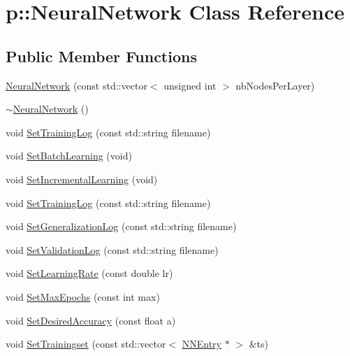 \hypertarget{classp_1_1NeuralNetwork}{\section{p\-:\-:\-Neural\-Network \-Class \-Reference}
\label{classp_1_1NeuralNetwork}
}
\subsection*{\-Public \-Member \-Functions}
\begin{DoxyCompactItemize}
\item 
\hyperlink{classp_1_1NeuralNetwork_a4ec206f877c28b8e71e2979e30329ebe}{\-Neural\-Network} (const std\-::vector$<$ unsigned int $>$ nb\-Nodes\-Per\-Layer)
\item 
\hyperlink{classp_1_1NeuralNetwork_ab0434af909567db330ee0cda44e99370}{$\sim$\-Neural\-Network} ()
\item 
void \hyperlink{classp_1_1NeuralNetwork_abdc9b3c37c6b241ec208e0e9612d321e}{\-Set\-Training\-Log} (const std\-::string filename)
\item 
void \hyperlink{classp_1_1NeuralNetwork_ac0a2e23be51d4b2362bbc42ef52d0885}{\-Set\-Batch\-Learning} (void)
\item 
void \hyperlink{classp_1_1NeuralNetwork_a489b8648c768f4e8a686224c04b32191}{\-Set\-Incremental\-Learning} (void)
\item 
void \hyperlink{classp_1_1NeuralNetwork_abdc9b3c37c6b241ec208e0e9612d321e}{\-Set\-Training\-Log} (const std\-::string filename)
\item 
void \hyperlink{classp_1_1NeuralNetwork_a4a19aeff57bcb5083724e450acb54b3d}{\-Set\-Generalization\-Log} (const std\-::string filename)
\item 
void \hyperlink{classp_1_1NeuralNetwork_a5aa0feae3126717b6aa18e32aed6ff5c}{\-Set\-Validation\-Log} (const std\-::string filename)
\item 
void \hyperlink{classp_1_1NeuralNetwork_aec0fd8d9d10f9391351bc096d823a338}{\-Set\-Learning\-Rate} (const double lr)
\item 
void \hyperlink{classp_1_1NeuralNetwork_a9769db0fa2698c55638e85e40de5d4e4}{\-Set\-Max\-Epochs} (const int max)
\item 
void \hyperlink{classp_1_1NeuralNetwork_aee5b025319092dec4d426bbbd0b3afce}{\-Set\-Desired\-Accuracy} (const float a)
\item 
void \hyperlink{classp_1_1NeuralNetwork_a6cf07a067fa61da8c2af2d1201224692}{\-Set\-Trainingset} (const std\-::vector$<$ \hyperlink{classp_1_1NNEntry}{\-N\-N\-Entry} $\ast$ $>$ \&ts)

\end{DoxyCompactItemize}
